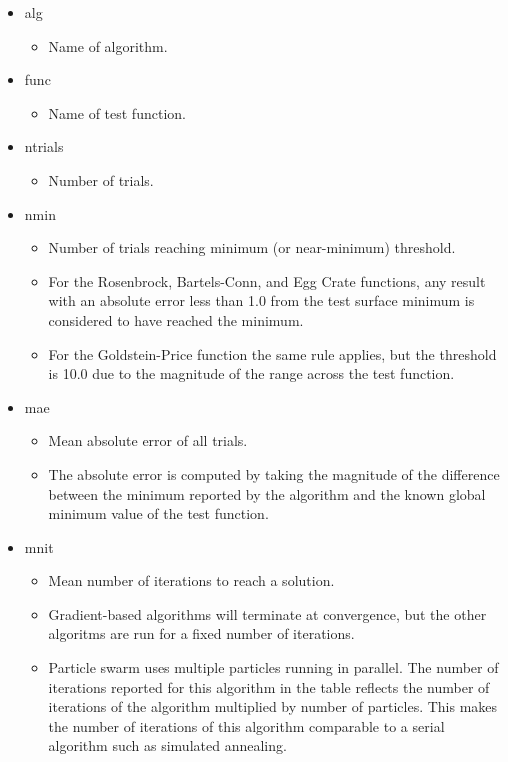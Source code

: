 \documentclass{vgtc}                          %
\begin{document}
\begin{itemize}
\item alg
\begin{itemize}
	\item Name of algorithm.
\end{itemize}
\item func
\begin{itemize}
	\item Name of test function.
\end{itemize}
\item ntrials
\begin{itemize}
	\item Number of trials.
\end{itemize}
\item nmin
\begin{itemize}
	\item Number of trials reaching minimum (or near-minimum) threshold.
	\item For the Rosenbrock, Bartels-Conn, and Egg Crate functions, any result with an absolute error less than 1.0 from the test surface minimum is considered to have reached the minimum.
	\item For the Goldstein-Price function the same rule applies, but the threshold is 10.0 due to the magnitude of the range across the test function.
\end{itemize}
\item mae
\begin{itemize}
	\item Mean absolute error of all trials.
	\item The absolute error is computed by taking the magnitude of the difference between the minimum reported by the algorithm and the known global minimum value of the test function.
\end{itemize}
\item mnit
\begin{itemize}
	\item Mean number of iterations to reach a solution.
    \item Gradient-based algorithms will terminate at convergence, but the other algoritms are run for a fixed number of iterations.
	\item Particle swarm uses multiple particles running in parallel. The number of iterations reported for this algorithm in the table reflects the number of iterations of the algorithm multiplied by number of particles.  This makes the number of iterations of this algorithm comparable to a serial algorithm such as simulated annealing.

\end{itemize}
\end{itemize}
\end{document}
